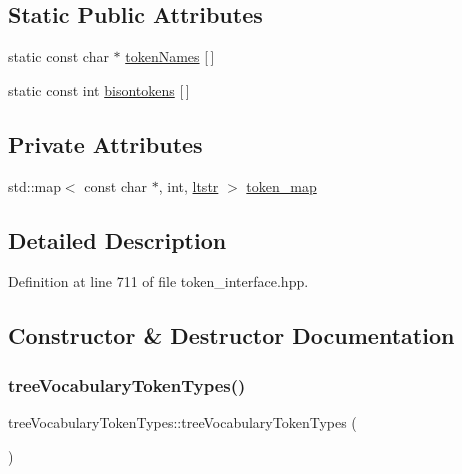 \subsection*{Static Public Attributes}
\begin{DoxyCompactItemize}
\item 
static const char $\ast$ \hyperlink{structtreeVocabularyTokenTypes_a0a6ba025732d57a9a9b330bfeb919881}{token\+Names} \mbox{[}$\,$\mbox{]}
\item 
static const int \hyperlink{structtreeVocabularyTokenTypes_af84fcf1475941be9f0cc17dc45d60a70}{bisontokens} \mbox{[}$\,$\mbox{]}
\end{DoxyCompactItemize}
\subsection*{Private Attributes}
\begin{DoxyCompactItemize}
\item 
std\+::map$<$ const char $\ast$, int, \hyperlink{structtreeVocabularyTokenTypes_1_1ltstr}{ltstr} $>$ \hyperlink{structtreeVocabularyTokenTypes_a2208e307304f60afa1c97b496137f1cf}{token\+\_\+map}
\end{DoxyCompactItemize}


\subsection{Detailed Description}


Definition at line 711 of file token\+\_\+interface.\+hpp.



\subsection{Constructor \& Destructor Documentation}
\mbox{\label{structtreeVocabularyTokenTypes_a7d0465713642ad90a2131e2f14c94273}} 
\subsubsection{\texorpdfstring{tree\+Vocabulary\+Token\+Types()}{treeVocabularyTokenTypes()}}
{\footnotesize\ttfamily tree\+Vocabulary\+Token\+Types\+::tree\+Vocabulary\+Token\+Types (\begin{DoxyParamCaption}{ }\end{DoxyParamCaption})}



